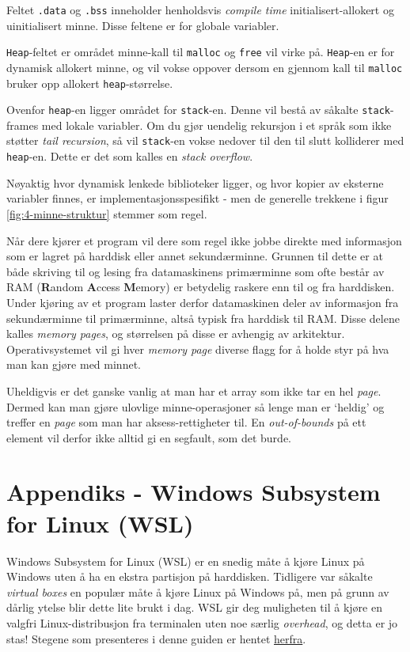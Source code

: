 Feltet \verb|.data| og \verb|.bss| inneholder henholdsvis \textit{compile time} initialisert-allokert og uinitialisert minne. Disse feltene er for globale variabler.

\verb|Heap|-feltet er området minne-kall til \verb|malloc| og \verb|free| vil virke på. \verb|Heap|-en er for dynamisk allokert minne, og vil vokse oppover dersom en gjennom kall til \verb|malloc| bruker opp allokert \verb|heap|-størrelse.

Ovenfor \verb|heap|-en ligger området for \verb|stack|-en. Denne vil bestå av såkalte \verb|stack|-frames med lokale variabler. Om du gjør uendelig rekursjon i et språk som ikke støtter \textit{tail recursion}, så vil \verb|stack|-en vokse nedover til den til slutt kolliderer med \verb|heap|-en. Dette er det som kalles en \textit{stack overflow}.

Nøyaktig hvor dynamisk lenkede biblioteker ligger, og hvor kopier av eksterne variabler finnes, er implementasjonsspesifikt - men de generelle trekkene i figur \ref{fig:4-minne-struktur} stemmer som regel.

Når dere kjører et program vil dere som regel ikke jobbe direkte med informasjon som er lagret på harddisk eller annet sekundærminne. Grunnen til dette er at både skriving til og lesing fra datamaskinens primærminne som ofte består av RAM (\textbf{R}andom \textbf{A}ccess \textbf{M}emory) er betydelig raskere enn til og fra harddisken. Under kjøring av et program laster derfor datamaskinen deler av informasjon fra sekundærminne til primærminne, altså typisk fra harddisk til RAM. Disse delene kalles \textit{memory pages}, og størrelsen på disse er avhengig av arkitektur. Operativsystemet vil gi hver \textit{memory page} diverse flagg for å holde styr på hva man kan gjøre med minnet.

Uheldigvis er det ganske vanlig at man har et array som ikke tar en hel \textit{page}. Dermed kan man gjøre ulovlige minne-operasjoner så lenge man er `heldig' og treffer en \textit{page} som man har aksess-rettigheter til. En \textit{out-of-bounds} på ett element vil derfor ikke alltid gi en segfault, som det burde.

\section{Appendiks - Windows Subsystem for Linux (WSL)}\label{app:wsl}
Windows Subsystem for Linux (WSL) er en snedig måte å kjøre Linux på Windows uten å ha en ekstra partisjon på harddisken. Tidligere var såkalte \textit{virtual boxes} en populær måte å kjøre Linux på Windows på, men på grunn av dårlig ytelse blir dette lite brukt i dag. WSL gir deg muligheten til å kjøre en valgfri Linux-distribusjon fra terminalen uten noe særlig \textit{overhead}, og detta er jo stas! Stegene som presenteres i denne guiden er hentet \href{https://learn.microsoft.com/en-us/windows/wsl/install}{herfra}.

